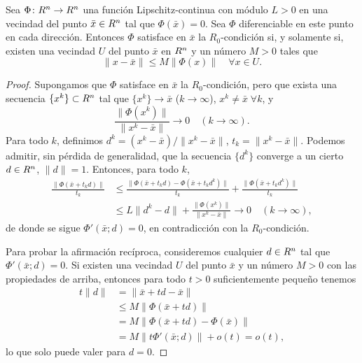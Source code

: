 \begin{theorem}\label{v2:thm:1.6.6}
    Sea $\Phi \colon R^n \to R^n$ una función Lipschitz-continua con módulo $L > 0$ en una vecindad del punto $\bar{x} \in R^n$ tal que $\Phi(\bar{x}) = 0$. Sea $\Phi$ diferenciable en este punto en cada dirección.
    Entonces $\Phi$ satisface en $\bar{x}$ la $R_0$-condición si, y solamente si, existen una vecindad $U$ del punto $\bar{x}$ en $R^n$ y un número $M > 0$ tales que
    \[
        \|x - \bar{x}\| \le M \|\Phi(x)\| \quad \forall x \in U.
    \]
\end{theorem}

\begin{proof}
    Supongamos que $\Phi$ satisface en $\bar{x}$ la $R_0$-condición, pero que exista una secuencia $\{x^k\} \subset R^n$ tal que $\{x^k\} \to \bar{x}$ ($k \to \infty$), $x^k \neq \bar{x} \; \forall k$, y
    \[
        \frac{\|\Phi(x^k)\|}{\|x^k - \bar{x}\|} \to 0 \quad (k \to \infty).
    \]
    Para todo $k$, definimos $d^k = (x^k - \bar{x}) / \|x^k - \bar{x}\|$, $t_k = \|x^k - \bar{x}\|$. Podemos admitir, sin pérdida de generalidad, que la secuencia $\{d^k\}$ converge a un cierto $d \in R^n$, $\|d\| = 1$. Entonces, para todo $k$,
    \begin{align*}
        \frac{\|\Phi(\bar{x} + t_k d)\|}{t_k} &\le \frac{\|\Phi(\bar{x} + t_k d) - \Phi(\bar{x} + t_k d^k)\|}{t_k} + \frac{\|\Phi(\bar{x} + t_k d^k)\|}{t_k} \\
        &\le L\|d^k - d\| + \frac{\|\Phi(x^k)\|}{\|x^k - \bar{x}\|} \to 0 \quad (k \to \infty),
    \end{align*}
    de donde se sigue $\Phi'(\bar{x}; d) = 0$, en contradicción con la $R_0$-condición.
    
    Para probar la afirmación recíproca, consideremos cualquier $d \in R^n$ tal que $\Phi'(\bar{x}; d) = 0$. Si existen una vecindad $U$ del punto $\bar{x}$ y un número $M > 0$ con las propiedades de arriba, entonces para todo $t > 0$ suficientemente pequeño tenemos
    \begin{align*}
        t\|d\| &= \|\bar{x} + td - \bar{x}\| \\
        &\le M\|\Phi(\bar{x} + td)\| \\
        &= M\|\Phi(\bar{x} + td) - \Phi(\bar{x})\| \\
        &= M\|t\Phi'(\bar{x}; d)\| + o(t) = o(t),
    \end{align*}
    lo que solo puede valer para $d = 0$.
\end{proof}
